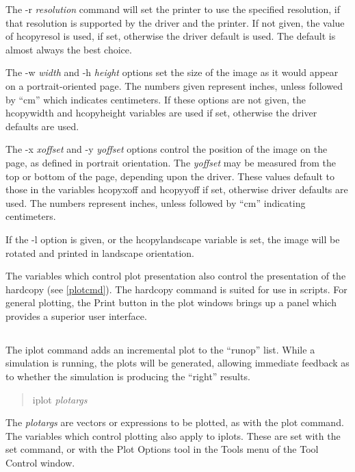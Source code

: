 The {\vt -r} {\it resolution} command will set the printer to use the
specified resolution, if that resolution is supported by the driver
and the printer.  If not given, the value of {\et hcopyresol} is used,
if set, otherwise the driver default is used.  The default is almost
always the best choice.

The {\vt -w} {\it width} and {\vt -h} {\it height} options set the
size of the image as it would appear on a portrait-oriented page.  The
numbers given represent inches, unless followed by ``cm'' which
indicates centimeters.  If these options are not given, the {\et
hcopywidth} and {\et hcopyheight} variables are used if set, otherwise
the driver defaults are used.

The {\vt -x} {\it xoffset} and {\vt -y} {\it yoffset} options control
the position of the image on the page, as defined in portrait
orientation.  The {\it yoffset} may be measured from the top or bottom
of the page, depending upon the driver.  These values default to those
in the variables {\et hcopyxoff} and {\et hcopyyoff} if set, otherwise
driver defaults are used.  The numbers represent inches, unless
followed by ``cm'' indicating centimeters.

If the {\vt -l} option is given, or the {\et hcopylandscape} variable
is set, the image will be rotated and printed in landscape
orientation.

The variables which control plot presentation also control the
presentation of the hardcopy (see \ref{plotcmd}).  The hardcopy
command is suited for use in scripts.  For general plotting, the {\cb
Print} button in the {\cb plot} windows brings up a panel which
provides a superior user interface.
 
\subsection{}


The {\cb iplot} command adds an incremental plot to the ``runop'' list.
While a simulation is running, the plots will be generated, allowing
immediate feedback as to whether the simulation is producing the
``right'' results.
\begin{quote}\vt
iplot {\it plotargs}
\end{quote}
The {\it plotargs} are vectors or expressions to be plotted, as with
the {\cb plot} command.  The variables which control plotting also
apply to iplots.  These are set with the {\cb set} command, or with
the {\cb Plot Options} tool in the {\cb Tools} menu of the {\cb Tool
Control} window.

